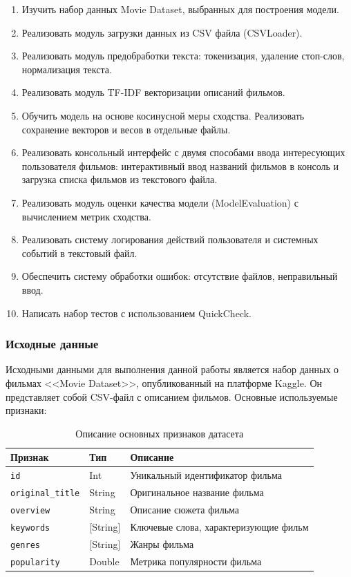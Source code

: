 \begin{enumerate}
    \item Изучить набор данных Movie Dataset, выбранных для построения модели.
    \item Реализовать модуль загрузки данных из CSV файла (CSVLoader).
    \item Реализовать модуль предобработки текста: токенизация, удаление стоп-слов, нормализация текста.
    \item Реализовать модуль TF-IDF векторизации описаний фильмов.
    \item Обучить модель на основе косинусной меры сходства. Реализовать сохранение векторов и весов в отдельные файлы.
    \item Реализовать консольный интерфейс с двумя способами ввода интересующих пользователя фильмов:
    интерактивный ввод названий фильмов в консоль и загрузка списка фильмов из текстового файла.
    \item Реализовать модуль оценки качества модели (ModelEvaluation) с вычислением метрик сходства.
    \item Реализовать систему логирования действий пользователя и системных событий в текстовый файл.
    \item Обеспечить систему обработки ошибок: отсутствие файлов, неправильный ввод.
    \item Написать набор тестов с использованием QuickCheck.
\end{enumerate}

\subsubsection{Исходные данные}

Исходными данными для выполнения данной работы является набор данных о фильмах <<Movie Dataset>>, опубликованный на платформе Kaggle. Он представляет собой CSV-файл с описанием фильмов. Основные используемые признаки:

\begin{table}[H]
\centering
\begin{tabularx}{\textwidth}{|l|l|X|}
\hline
\textbf{Признак} & \textbf{Тип} & \textbf{Описание} \\
\hline
\texttt{id}  & Int & Уникальный идентификатор фильма \\
\texttt{original\_title} & String & Оригинальное название фильма \\
\texttt{overview} & String & Описание сюжета фильма \\
\texttt{keywords} & [String] & Ключевые слова, характеризующие фильм \\
\texttt{genres} & [String] & Жанры фильма \\
\texttt{popularity} & Double & Метрика популярности фильма \\
\hline
\end{tabularx}
\label{features}
\caption{Описание основных признаков датасета}
\end{table}

